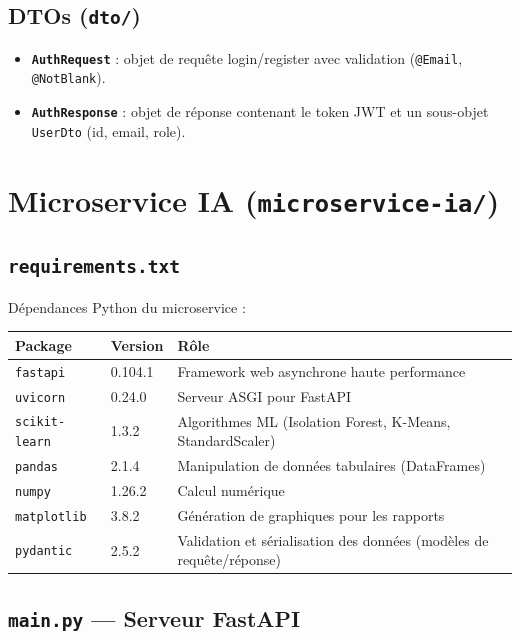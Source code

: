 \documentclass[a4paper,12pt]{report}
\begin{document}
\section{DTOs (\texttt{dto/})}

\begin{itemize}
  \item \textbf{\texttt{AuthRequest}} : objet de requête login/register avec validation (\texttt{@Email}, \texttt{@NotBlank}).
  \item \textbf{\texttt{AuthResponse}} : objet de réponse contenant le token JWT et un sous-objet \texttt{UserDto} (id, email, role).
\end{itemize}


\chapter{Microservice IA (\texttt{microservice-ia/})}

\section{\texttt{requirements.txt}}
Dépendances Python du microservice :
\begin{center}
\begin{tabularx}{\textwidth}{|l|l|X|}
\hline
\textbf{Package} & \textbf{Version} & \textbf{Rôle} \\
\hline
\texttt{fastapi} & 0.104.1 & Framework web asynchrone haute performance \\
\hline
\texttt{uvicorn} & 0.24.0 & Serveur ASGI pour FastAPI \\
\hline
\texttt{scikit-learn} & 1.3.2 & Algorithmes ML (Isolation Forest, K-Means, StandardScaler) \\
\hline
\texttt{pandas} & 2.1.4 & Manipulation de données tabulaires (DataFrames) \\
\hline
\texttt{numpy} & 1.26.2 & Calcul numérique \\
\hline
\texttt{matplotlib} & 3.8.2 & Génération de graphiques pour les rapports \\
\hline
\texttt{pydantic} & 2.5.2 & Validation et sérialisation des données (modèles de requête/réponse) \\
\hline
\end{tabularx}
\end{center}

\section{\texttt{main.py} --- Serveur FastAPI}
\end{document}
